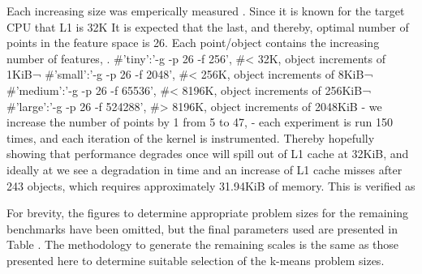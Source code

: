 \documentclass[../document.tex]{subfiles}
\begin{document}
Each increasing size was emperically measured .
Since it is known for the target CPU that L1 is 32K
It is expected that the last, and thereby, optimal number of points in the feature space is 26.
Each point/object contains the increasing number of features, .
    #'tiny':'-g -p 26 -f 256',     #< 32K, object increments of 1KiB¬
    #'small':'-g -p 26 -f 2048',   #< 256K, object increments of 8KiB¬
    #'medium':'-g -p 26 -f 65536', #< 8196K, object increments of 256KiB¬
    #'large':'-g -p 26 -f 524288', #> 8196K, object increments of 2048KiB
    - we increase the number of points by 1 from 5 to 47,
    - each experiment is run 150 times, and each iteration of the kernel is instrumented.
Thereby hopefully showing that performance degrades once will spill out of L1 cache at 32KiB, and ideally at we see a degradation in time and an increase of L1 cache misses after 243 objects, which requires approximately 31.94KiB of memory. 
This is verified as 


For brevity, the figures to determine appropriate problem sizes for the remaining benchmarks have been omitted, but the final parameters used are presented in Table{} .
The methodology to generate the remaining scales is the same as those presented here to determine suitable selection of the k-means problem sizes.
\end{document}
